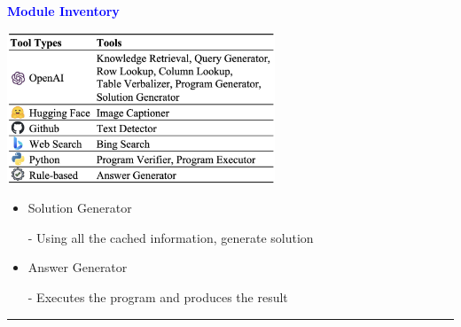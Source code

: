 \documentclass[professionalfont]{beamer}
\begin{document}
\begin{frame}
\begin{refsection}

\begin{center}
    { \textbf{\textcolor{blue}{ {\fontsize{12}{14}\selectfont Module Inventory} }} }
\end{center}

\begin{center}
    \includegraphics[width=0.6\textwidth]{table/2.png}
\end{center}

\begin{itemize}
    \item Solution Generator

    - Using all the cached information, generate solution \cite{CoT}

    \item Answer Generator

    - Executes the program and produces the result
\end{itemize}

\vspace{0.3cm}
\hrule
\printbibliography

\end{refsection}
\end{frame}
\end{document}
